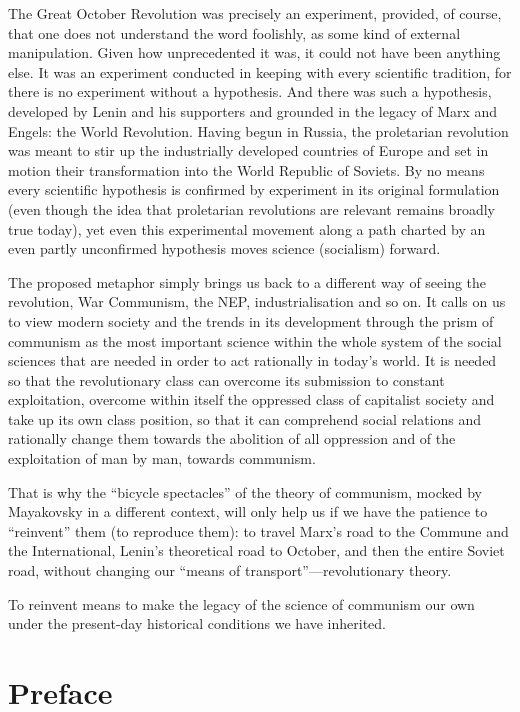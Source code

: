 \documentclass[12pt,a4paper,openany]{book}
\begin{document}
The Great October Revolution was precisely an experiment, provided, of course, that one does not understand the word foolishly, as some kind of external manipulation. Given how unprecedented it was, it could not have been anything else. It was an experiment conducted in keeping with every scientific tradition, for there is no experiment without a hypothesis. And there was such a hypothesis, developed by Lenin and his supporters and grounded in the legacy of Marx and Engels: the World Revolution. Having begun in Russia, the proletarian revolution was meant to stir up the industrially developed countries of Europe and set in motion their transformation into the World Republic of Soviets. By no means every scientific hypothesis is confirmed by experiment in its original formulation (even though the idea that proletarian revolutions are relevant remains broadly true today), yet even this experimental movement along a path charted by an even partly unconfirmed hypothesis moves science (socialism) forward.

The proposed metaphor simply brings us back to a different way of seeing the revolution, War Communism, the NEP, industrialisation and so on. It calls on us to view modern society and the trends in its development through the prism of communism as the most important science within the whole system of the social sciences that are needed in order to act rationally in today’s world. It is needed so that the revolutionary class can overcome its submission to constant exploitation, overcome within itself the oppressed class of capitalist society and take up its own class position, so that it can comprehend social relations and rationally change them towards the abolition of all oppression and of the exploitation of man by man, towards communism.

That is why the “bicycle spectacles” of the theory of communism, mocked by Mayakovsky in a different context, will only help us if we have the patience to “reinvent” them (to reproduce them): to travel Marx’s road to the Commune and the International, Lenin’s theoretical road to October, and then the entire Soviet road, without changing our “means of transport”—revolutionary theory.

To reinvent means to make the legacy of the science of communism our own under the present-day historical conditions we have inherited.
\ifSubfilesClassLoaded{\setcounter{page}{7}}{}
\section{Preface}
\label{sec:02_preface}
\end{document}

